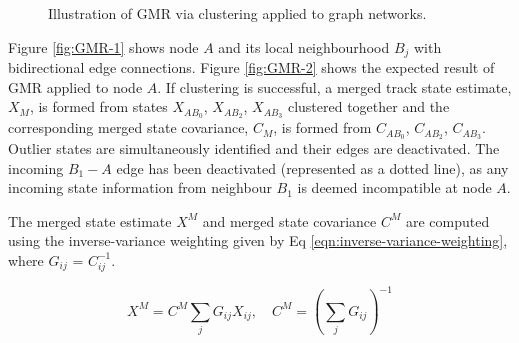 \begin{figure}[htbp!] 
    \centering
    \hfill%
    \caption{Illustration of GMR via clustering applied to graph networks.}
    \label{fig:GMR-example}
\end{figure}


Figure \ref{fig:GMR-1} shows node $A$ and its local neighbourhood $B_j$ with bidirectional edge connections. Figure \ref{fig:GMR-2} shows the expected result of GMR applied to node $A$. If clustering is successful, a merged track state estimate, $X_M$, is formed from states $X_{AB_0}$, $X_{AB_2}$, $X_{AB_3}$ clustered together and the corresponding merged state covariance, $C_M$, is formed from $C_{AB_0}$, $C_{AB_2}$, $C_{AB_3}$. Outlier states are simultaneously identified and their edges are deactivated. The incoming $B_1 - A$ edge has been deactivated (represented as a dotted line), as any incoming state information from neighbour $B_1$ is deemed incompatible at node $A$.

The merged state estimate $X^{M}$ and merged state covariance $C^{M}$ are computed using the inverse-variance weighting \cite{inverse-variance-weighting} given by Eq \eqref{eqn:inverse-variance-weighting}, where $G_{ij}$ = $C_{ij}^{-1}$.

\begin{equation}
    X^{M} = C^{M} \sum_{j} G_{ij} X_{ij},  \quad  C^{M} = \left( \sum_{j} G_{ij} \right) ^{-1}
    \label{eqn:inverse-variance-weighting}
\end{equation}


